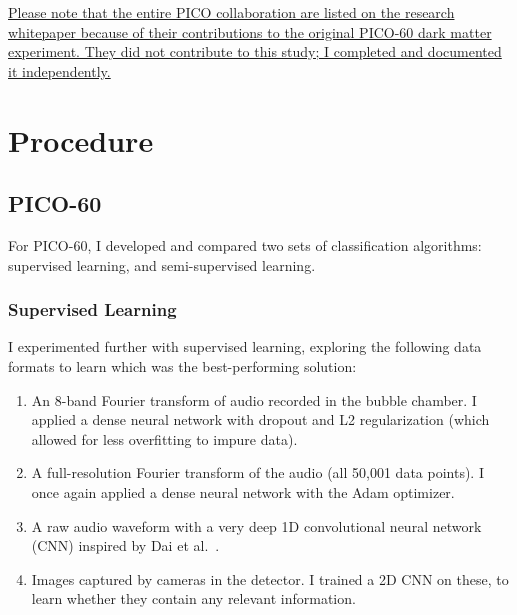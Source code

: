 \documentclass[12pt]{article}
\begin{document}
\ul{Please note that the entire PICO collaboration are listed on the research whitepaper because of their contributions to the original PICO-60 dark matter experiment. They did not contribute to this study; I completed and documented it independently.}

\section{Procedure}

\subsection{PICO-60}

For PICO-60, I developed and compared two sets of classification algorithms: supervised learning, and semi-supervised learning.

\subsubsection{Supervised Learning}

I experimented further with supervised learning, exploring the following data formats to learn which was the best-performing solution:

\begin{enumerate}
    \item An 8-band Fourier transform of audio recorded in the bubble chamber. I applied a dense neural network with dropout \cite{dropout} and L2 regularization (which allowed for less overfitting to impure data).
    \item A full-resolution Fourier transform of the audio (all 50,001 data points). I once again applied a dense neural network with the Adam \cite{adam} optimizer.
    \item A raw audio waveform with a very deep 1D convolutional neural network (CNN) inspired by Dai et al.\ \cite{verydeepconvnets}.
    \item Images captured by cameras in the detector. I trained a 2D CNN on these, to learn whether they contain any relevant information.
\end{enumerate}
\end{document}
